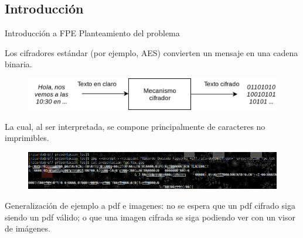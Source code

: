 %
%

\subsection{Introducción}

\begin{frame}{Introducción a FPE}
  {Planteamiento del problema}

  Los cifradores estándar (por ejemplo, AES) convierten un mensaje en una
  cadena binaria.

  \begin{figure}[H]
    \begin{center}
      \includegraphics[width=0.75\linewidth]{diagramas/cifrador_estandar.png}
    \end{center}
  \end{figure}


  La cual, al ser interpretada, se compone principalmente de caracteres no
  imprimibles.

  \begin{figure}[H]
    \begin{center}
      \includegraphics[width=1.0\linewidth]{diagramas/no_imprimibles.png}
    \end{center}
  \end{figure}

  {
    Generalización de ejemplo a pdf e imagenes: no se espera que un pdf cifrado
    siga siendo un pdf válido; o que una imagen cifrada se siga podiendo
    ver con un visor de imágenes.
  }

\end{frame}

